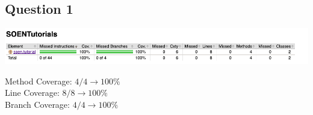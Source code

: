 \newpage
\subsection*{Question 1}

\begin{center}
        \includegraphics[width=1.1\textwidth]{img/tutorial.png}
\end{center}

\noindent Method Coverage: $4/4 \rightarrow 100\%$ \\
\noindent Line Coverage: $8/8 \rightarrow 100\%$\\
\noindent Branch Coverage: $4/4 \rightarrow 100\%$

